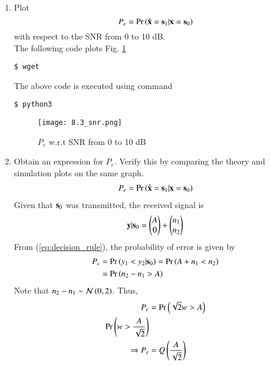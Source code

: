 \documentclass[journal,12pt,twocolumn]{IEEEtran}
\renewcommand\thesection{\arabic{section}}
\begin{document}
\begin{enumerate}[label=\thesection.\arabic*
,ref=\thesection.\theenumi]
\begin{align}
    \label{eq:map_bfsk_dec}
    p\brak{\vec{y}|s_0} &\dec{s_0}{s_1} p\brak{\vec{y}|s_1}
    \end{align}
    Using (\ref{gauss_mutl_var1}) and (\ref{gauss_mutl_var2}) and substituting the values from (\ref{rho_sig_val}),  we get
    \begin{align}
    (y_1 -A)^2 + y_2^2 \dec{s_1}{s_0} y_1^2 + (y_2 - A)^2
    \end{align}
    On simplifying, we get the decision rule is
    \begin{align}
    \label{eq:decision_rule}
    y_1 \dec{s_0}{s_1} y_2
    \end{align}

\item
Plot 
\begin{equation} 
P_e = \Pr\left(\hat{\mathbf{x}} = \mathbf{s}_1|\mathbf{x} = \mathbf{s}_0\right)
\end{equation}
with respect to the SNR from 0 to 10 dB.\\
%
\solution The following code plots Fig. \ref{fig:8.3_snr}\\
\begin{lstlisting}
$ wget
\end{lstlisting}
The above code is executed using command
\begin{lstlisting}
$ python3 
\end{lstlisting}
\begin{figure}[h]
    \centering
    \texttt{[image: 8.3\_snr.png]}
    \caption{$P_e$ w.r.t SNR from 0 to 10 dB}
    \label{fig:8.3_snr}
\end{figure}
\item
Obtain an expression for $P_e$. Verify this by comparing the theory and simulation plots on the same graph.\\
%
\solution 
\begin{align}
P_e = \Pr\left(\hat{\mathbf{x}} = \mathbf{s}_1|\mathbf{x} = \mathbf{s}_0\right)
\end{align}
Given that $\mathbf{s}_0$ was transmitted, the received signal is
\begin{align}
\mathbf{y}|\mathbf{s}_0 = \begin{pmatrix} A \\ 0 \end{pmatrix} + \begin{pmatrix} n_1 \\ n_2 \end{pmatrix}
\end{align}
From (\ref{eq:decision_rule}), the probability of error is given by 
\begin{align}
P_e &= \Pr\left(y_1 < y_2 |\mathbf{s}_0\right) = \Pr\left(A+n_1 < n_2\right)\\
&= \Pr\left(n_2 - n_1 > A\right)
\end{align}
Note that $n_2 - n_1 \sim \mathcal{N}\left(0,2\right)$. Thus,
\begin{align}
P_e &= \Pr\left(\sqrt{2}w > A\right)\\
\Pr\left(w > \dfrac{A}{\sqrt{2}}\right)\\
\Rightarrow P_e &= Q\left(\frac{A}{\sqrt{2}}\right)
\end{align}


\end{enumerate}
\end{document}
